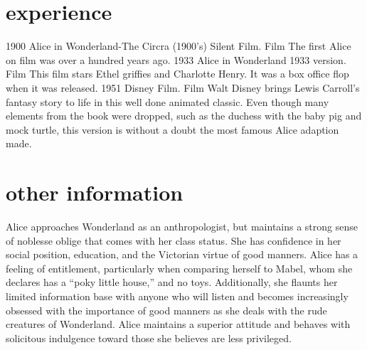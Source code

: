 \documentclass[icon]{twentysecondcv}
\begin{document}
\section{experience}
\begin{twenty}
  \twentyitem
    {1900}
    {Alice in Wonderland-The Circra (1900's) Silent Film.}
    {Film}
    {The first Alice on film was over a hundred years ago.}
  \twentyitem
    {1933}
    {Alice in Wonderland 1933 version.}
    {Film}
    {This film stars Ethel griffies and Charlotte Henry. It was a box office flop when it was released.}
\twentyitem
    {1951}
    {Disney Film.}
    {Film}
    {Walt Disney brings Lewis Carroll's fantasy story to life in this well done animated classic. Even though many elements from the book were dropped, such as the duchess with the baby pig and mock turtle, this version is without a doubt the most famous Alice adaption made.}
\end{twenty}

\section{other information}
Alice approaches Wonderland as an anthropologist, but maintains a strong sense of noblesse oblige that comes with her class status. She has confidence in her social position, education, and the Victorian virtue of good manners. Alice has a feeling of entitlement, particularly when comparing herself to Mabel, whom she declares has a “poky little house,” and no toys. Additionally, she flaunts her limited information base with anyone who will listen and becomes increasingly obsessed with the importance of good manners as she deals with the rude creatures of Wonderland. Alice maintains a superior attitude and behaves with solicitous indulgence toward those she believes are less privileged.

\end{document}
